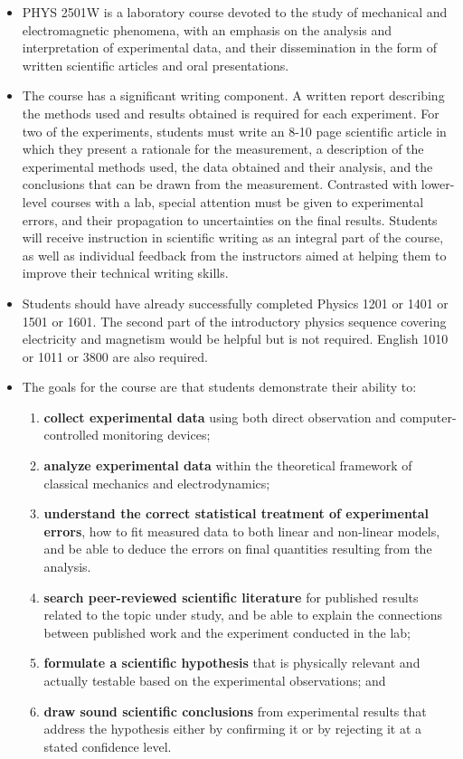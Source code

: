 \documentclass{revtex4}
\begin{document}
\begin{itemize}
\item
PHYS 2501W is a laboratory course devoted to the study of mechanical and
electromagnetic phenomena, with an emphasis on the analysis and
interpretation of experimental data, and their dissemination in the
form of written scientific articles and oral presentations.
\item
The course has a significant writing component. A written report describing
the methods used and results obtained is required for each experiment.
For two of the experiments, students must write an 8-10 page scientific
article in which they present a rationale for the measurement, a description
of the experimental methods used, the data obtained and their analysis, and
the conclusions that can be drawn from the measurement. Contrasted with
lower-level courses with a lab, special attention must be given to
experimental errors, and their propagation to uncertainties on the final
results. Students will receive instruction in scientific writing as an
integral part of the course, as well as individual feedback from the
instructors aimed at helping them to improve their technical writing skills.
\item
Students should have already successfully completed Physics 1201 or 1401 or
1501 or 1601. The second part of the introductory physics sequence covering
electricity and magnetism would be helpful but is not required. English 1010
or 1011 or 3800 are also required.
\item
The goals for the course are that students demonstrate their ability to:
\begin{enumerate}
\item
{\bf collect experimental data} using both direct observation and
computer-controlled monitoring devices;
\item
{\bf analyze experimental data} within the theoretical framework of
classical mechanics and electrodynamics;
\item
{\bf understand the correct statistical treatment of experimental errors},
how to fit measured data to both linear and non-linear models, and be able
to deduce the errors on final quantities resulting from the analysis.
\item
{\bf search peer-reviewed scientific literature} for published results
related to the topic under study, and be able to explain the connections
between published work and the experiment conducted in the lab;
\item
{\bf formulate a scientific hypothesis} that is physically relevant and
actually testable based on the experimental observations; and
\item
{\bf draw sound scientific conclusions} from experimental results that
address the hypothesis either by confirming it or by rejecting it at a
stated confidence level.
\end{enumerate}
\end{itemize}
\end{document}
